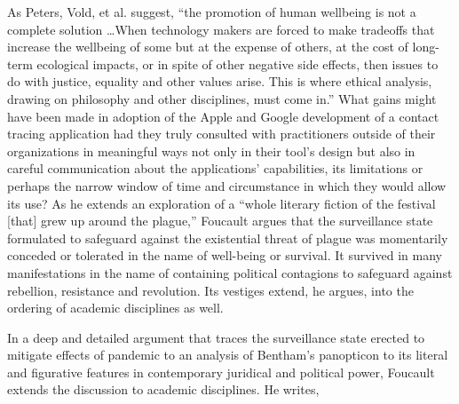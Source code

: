 \documentclass[11pt,dvipdfm]{article}
\begin{document}
As Peters, Vold, et al. suggest, ``the promotion of human wellbeing is not a complete solution \ldots When technology makers are forced to make tradeoffs that increase the wellbeing of some but at the expense of others, at the cost of long-term ecological impacts, or in spite of other negative side effects, then issues to do with justice, equality and other values arise.  This is where ethical analysis, drawing on philosophy and other disciplines, must come in.''  What gains might have been made in adoption of the Apple and Google development of a contact tracing application had they truly consulted with practitioners outside of their organizations in meaningful ways not only in their tool’s design but also in careful communication about the applications’ capabilities, its limitations or perhaps the narrow window of time and circumstance in which they would allow its use?  As he extends an exploration of a ``whole literary fiction of the festival [that] grew up around the plague,'' Foucault argues that the surveillance state formulated to safeguard against the existential threat of plague was momentarily conceded or tolerated in the name of well-being or survival.  It survived in many manifestations in the name of containing political contagions to safeguard against rebellion, resistance and revolution.  Its vestiges extend, he argues, into the ordering of academic disciplines as well.  

In a deep and detailed argument that traces the surveillance state erected to mitigate effects of pandemic to an analysis of Bentham’s panopticon to its literal and figurative features in contemporary juridical and political power, Foucault extends the discussion to academic disciplines.  He writes,  
\end{document}
